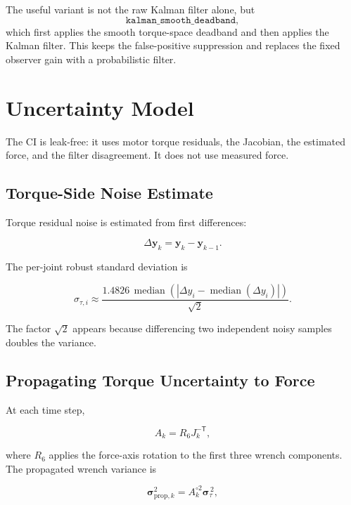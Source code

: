 \documentclass[11pt]{article}
\begin{document}
The useful variant is not the raw Kalman filter alone, but
\[
\texttt{kalman\_smooth\_deadband},
\]
which first applies the smooth torque-space deadband and then applies the
Kalman filter. This keeps the false-positive suppression and replaces the fixed
observer gain with a probabilistic filter.

\section{Uncertainty Model}

The CI is leak-free: it uses motor torque residuals, the Jacobian, the estimated
force, and the filter disagreement. It does not use measured force.

\subsection{Torque-Side Noise Estimate}

Torque residual noise is estimated from first differences:

\begin{equation}
\Delta \bm y_k = \bm y_k - \bm y_{k-1}.
\end{equation}

The per-joint robust standard deviation is

\begin{equation}
\sigma_{\tau,i}
\approx
\frac{1.4826\,\operatorname{median}
\left(|\Delta y_i-\operatorname{median}(\Delta y_i)|\right)}
{\sqrt{2}}.
\end{equation}

The factor \(\sqrt{2}\) appears because differencing two independent noisy
samples doubles the variance.

\subsection{Propagating Torque Uncertainty to Force}

At each time step,

\begin{equation}
A_k = R_6 J_k^{-\mathsf{T}},
\end{equation}

where \(R_6\) applies the force-axis rotation to the first three wrench
components. The propagated wrench variance is

\begin{equation}
\bm \sigma_{\mathrm{prop},k}^2
= A_k^{\circ 2} \bm \sigma_\tau^{\,2},
\end{equation}
\end{document}
